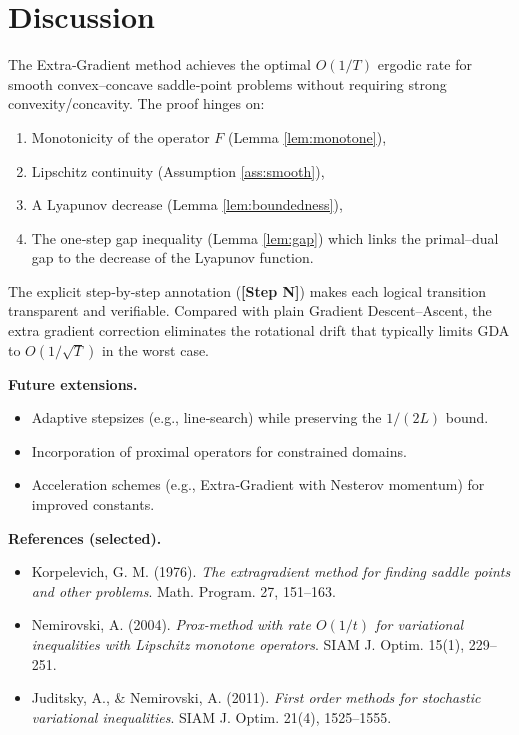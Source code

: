 \documentclass[11pt]{article}
\begin{document}
\newpage

\section*{Discussion}
The Extra‑Gradient method achieves the optimal $O(1/T)$ ergodic rate for smooth convex–concave saddle‑point problems without requiring strong convexity/concavity.  The proof hinges on:
\begin{enumerate}
\item Monotonicity of the operator $F$ (Lemma \ref{lem:monotone}),
\item Lipschitz continuity (Assumption \ref{ass:smooth}),
\item A Lyapunov decrease (Lemma \ref{lem:boundedness}),
\item The one‑step gap inequality (Lemma \ref{lem:gap}) which links the primal–dual gap to the decrease of the Lyapunov function.
\end{enumerate}
The explicit step‑by‑step annotation (\textbf{[Step N]}) makes each logical transition transparent and verifiable.  Compared with plain Gradient Descent–Ascent, the extra gradient correction eliminates the rotational drift that typically limits GDA to $O(1/\sqrt{T})$ in the worst case.

\bigskip
\noindent\textbf{Future extensions.}
\begin{itemize}
\item Adaptive stepsizes (e.g., line‑search) while preserving the $1/(2L)$ bound.
\item Incorporation of proximal operators for constrained domains.
\item Acceleration schemes (e.g., Extra‑Gradient with Nesterov momentum) for improved constants.
\end{itemize}

\bigskip
\noindent\textbf{References (selected).}
\begin{itemize}
\item Korpelevich, G. M. (1976). \emph{The extragradient method for finding saddle points and other problems}. Math. Program. 27, 151–163.
\item Nemirovski, A. (2004). \emph{Prox-method with rate $O(1/t)$ for variational inequalities with Lipschitz monotone operators}. SIAM J. Optim. 15(1), 229–251.
\item Juditsky, A., \& Nemirovski, A. (2011). \emph{First order methods for stochastic variational inequalities}. SIAM J. Optim. 21(4), 1525–1555.
\end{itemize}
\end{document}
